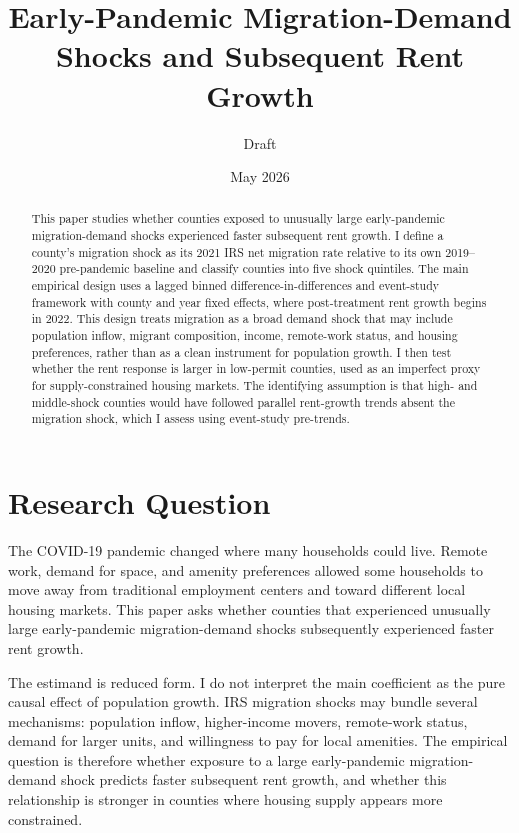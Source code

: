 \documentclass[11pt]{article}
\title{Early-Pandemic Migration-Demand Shocks and Subsequent Rent Growth}
\author{Draft}
\date{May 2026}
\begin{document}
\maketitle

\begin{abstract}
This paper studies whether counties exposed to unusually large early-pandemic migration-demand shocks experienced faster subsequent rent growth. I define a county's migration shock as its 2021 IRS net migration rate relative to its own 2019--2020 pre-pandemic baseline and classify counties into five shock quintiles. The main empirical design uses a lagged binned difference-in-differences and event-study framework with county and year fixed effects, where post-treatment rent growth begins in 2022. This design treats migration as a broad demand shock that may include population inflow, migrant composition, income, remote-work status, and housing preferences, rather than as a clean instrument for population growth. I then test whether the rent response is larger in low-permit counties, used as an imperfect proxy for supply-constrained housing markets. The identifying assumption is that high- and middle-shock counties would have followed parallel rent-growth trends absent the migration shock, which I assess using event-study pre-trends.
\end{abstract}

\section{Research Question}

The COVID-19 pandemic changed where many households could live. Remote work, demand for space, and amenity preferences allowed some households to move away from traditional employment centers and toward different local housing markets. This paper asks whether counties that experienced unusually large early-pandemic migration-demand shocks subsequently experienced faster rent growth.

The estimand is reduced form. I do not interpret the main coefficient as the pure causal effect of population growth. IRS migration shocks may bundle several mechanisms: population inflow, higher-income movers, remote-work status, demand for larger units, and willingness to pay for local amenities. The empirical question is therefore whether exposure to a large early-pandemic migration-demand shock predicts faster subsequent rent growth, and whether this relationship is stronger in counties where housing supply appears more constrained.
\end{document}
